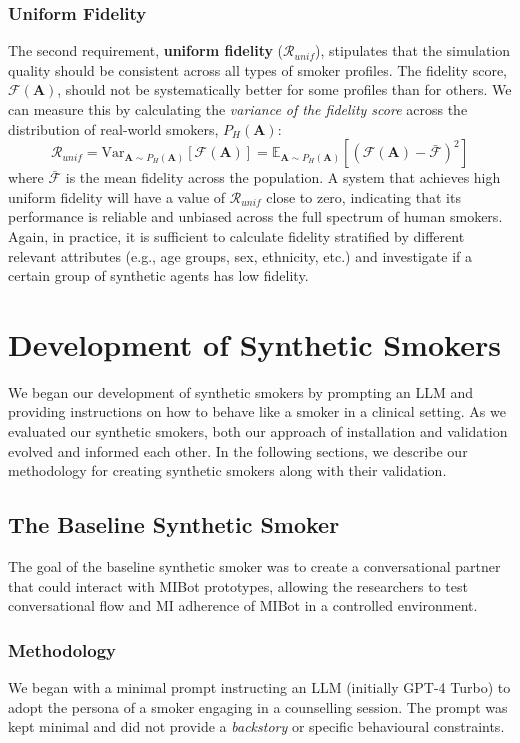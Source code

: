 \subsubsection{Uniform Fidelity}

The second requirement, \textbf{uniform fidelity} ($\mathcal{R}_{unif}$), stipulates that the simulation quality should be consistent across all types of smoker profiles. The fidelity score, $\mathcal{F}(\textbf{A})$, should not be systematically better for some profiles than for others. We can measure this by calculating the \textit{variance of the fidelity score} across the distribution of real-world smokers, $P_H(\textbf{A})$:
$$\mathcal{R}_{unif} = \text{Var}_{\textbf{A} \sim P_H(\textbf{A})}[\mathcal{F}(\textbf{A})] = \mathbb{E}_{\textbf{A} \sim P_H(\textbf{A})} [(\mathcal{F}(\textbf{A}) - \bar{\mathcal{F}})^2]$$
where $\bar{\mathcal{F}}$ is the mean fidelity across the population. A system that achieves high uniform fidelity will have a value of $\mathcal{R}_{unif}$ close to zero, indicating that its performance is reliable and unbiased across the full spectrum of human smokers. Again, in practice, it is sufficient to calculate fidelity stratified by different relevant attributes (e.g., age groups, sex, ethnicity, etc.) and investigate if a certain group of synthetic agents has low fidelity.


\section{Development of Synthetic Smokers}
We began our development of synthetic smokers by prompting an LLM and providing instructions on how to behave like a smoker in a clinical setting. As we evaluated our synthetic smokers, both our approach of installation and validation evolved and informed each other. In the following sections, we describe our methodology for creating synthetic smokers along with their validation.


\subsection{The Baseline Synthetic Smoker}
\label{sec:synthetic-smoker-baseline}
The goal of the baseline synthetic smoker was to create a conversational partner that could interact with MIBot prototypes, allowing the researchers to test conversational flow and MI adherence of MIBot in a controlled environment.


\subsubsection{Methodology}
We began with a minimal prompt instructing an LLM (initially GPT-4 Turbo) to adopt the persona of a smoker engaging in a counselling session. The prompt was kept minimal and did not provide a \emph{backstory} or specific behavioural constraints.

